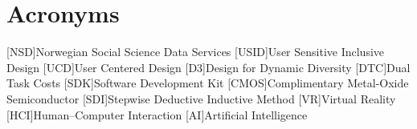 \chapter*{Acronyms}
\begin{acronym}
[NSD]{Norwegian Social Science Data Services}
[USID]{User Sensitive Inclusive Design}
[UCD]{User Centered Design}
[D3]{Design for Dynamic Diversity}
[DTC]{Dual Task Costs}
[SDK]{Software Development Kit}
[CMOS]{Complimentary Metal-Oxide Semiconductor}
[SDI]{Stepwise Deductive Inductive Method}
[VR]{Virtual Reality}
[HCI]{Human–Computer Interaction}
[AI]{Artificial Intelligence}
\end{acronym}